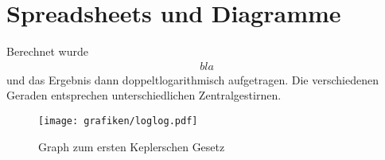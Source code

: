 \section{Spreadsheets und Diagramme}
Berechnet wurde
\begin{align*}
    bla
    \label{eqn:umlauf}
\end{align*}
und das Ergebnis dann doppeltlogarithmisch aufgetragen. Die verschiedenen
Geraden entsprechen unterschiedlichen Zentralgestirnen.

\begin{figure}[h!]
  \begin{center}
    \texttt{[image: grafiken/loglog.pdf]}
  \end{center}
  \caption{Graph zum ersten Keplerschen Gesetz}
  \label{fig:loglog}
\end{figure}


